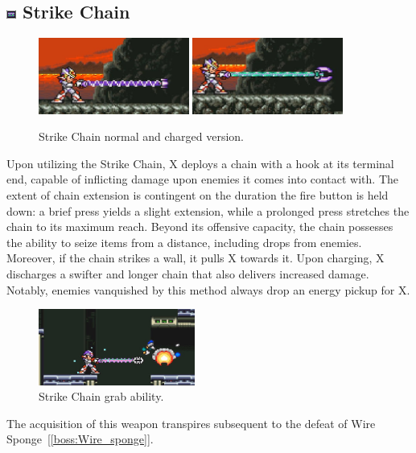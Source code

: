 \subsection{\includegraphics[width=12px, height=10px]{figures/X2/weapons/S_chain.png} Strike Chain}\label{Strike_chain}
\begin{figure}[htp]
	\centering
	\includegraphics[height=2.5cm]{figures/X2/weapons/S_chain_1.png}	
	\includegraphics[height=2.5cm]{figures/X2/weapons/S_chain_2.png}	
	\caption{Strike Chain normal and charged version.}
\end{figure}
Upon utilizing the Strike Chain, X deploys a chain with a hook at its terminal end, capable of inflicting damage upon enemies it comes into contact with. The extent of chain extension is contingent on the duration the fire button is held down: a brief press yields a slight extension, while a prolonged press stretches the chain to its maximum reach. Beyond its offensive capacity, the chain possesses the ability to seize items from a distance, including drops from enemies. Moreover, if the chain strikes a wall, it pulls X towards it. Upon charging, X discharges a swifter and longer chain that also delivers increased damage. Notably, enemies vanquished by this method always drop an energy pickup for X.

\begin{figure}[htp]
	\centering
	\includegraphics[height=2.5cm]{figures/X2/weapons/S_chain_grub.jpg}	
	\caption{Strike Chain grab ability.}
\end{figure}
The acquisition of this weapon transpires subsequent to the defeat of Wire Sponge~[\ref{boss:Wire_sponge}].

